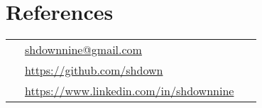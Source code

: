 \documentclass[10pt]{article}
\begin{document}
\medskip

\section{References}

\parbox[top][0.12\textheight][c]{\linewidth}{
    \vspace{-0.04\textheight}
    \colorbox{shade}{
        \begin{tabular}{p{0.05\linewidth}|p{0.885\linewidth}}
            \raisebox{0pt}{\small  \faEnvelope}        & \href{mailto:shdownnine@gmail.com}{shdownnine@gmail.com} \\
            \raisebox{-1pt}{\small \faGithubAlt}       & \href{https://github.com/shdown}{https://github.com/shdown} \\
            \raisebox{-1pt}{\small \faLinkedinSquare}  & \href{https://www.linkedin.com/in/shdownnine}{https://www.linkedin.com/in/shdownnine} \\
        \end{tabular}
    }
}
\end{document}
